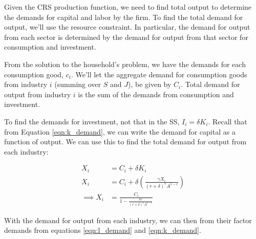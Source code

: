 \documentclass[letterpaper,12pt]{article}
\theoremstyle{definition}
\begin{document}
\begin{spacing}{1.5}
Given the CRS production function, we need to find total output to determine the demands for capital and labor by the firm.  To find the total demand for output, we'll use the resource constraint.  In particular, the demand for output from each sector is determined by the demand for output from that sector for consumption and investment.

From the solution to the household's problem, we have the demands for each consumption good, $c_{i}$.  We'll let the aggregate demand for consumption goods from industry $i$ (summing over $S$ and $J$), be given by $C_{i}$.  Total demand for output from industry $i$ is the sum of the demands from consumption and investment.

To find the demands for investment, not that in the SS, $I_{i}=\delta K_{i}$.  Recall that from Equation \ref{eqn:k_demand}, we can write the demand for capital as a function of output.  We can use this to find the total demand for output from each industry:

\begin{equation}
\label{eqn:find_output}
\begin{split}
X_{i} &= C_{i} + \delta K_{i} \\
X_{i} &= C_{i} + \delta \left(\frac{\gamma X_{i}}{(r+\delta)^{\epsilon}A^{1-\epsilon}} \right)\\
\implies X_{i} &= \frac{C_{i}}{1-\frac{\delta \gamma}{(r+\delta)^{\epsilon}A^{1-\epsilon}}}
\end{split}
\end{equation}  

With the demand for output from each industry, we can then from their factor demands from equations \ref{eqn:l_demand} and \ref{eqn:k_demand}.


\end{spacing}
\end{document}
